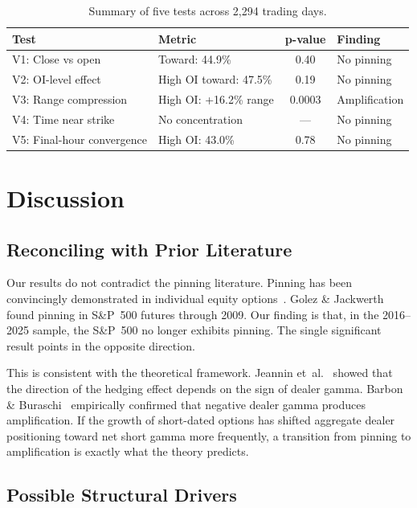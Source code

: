 \documentclass[11pt]{article}
\begin{document}
\begin{table}[h]
\centering
\begin{tabular}{llcl}
\toprule
Test & Metric & p-value & Finding \\
\midrule
V1: Close vs open & Toward: 44.9\% & 0.40 & No pinning \\
V2: OI-level effect & High OI toward: 47.5\% & 0.19 & No pinning \\
V3: Range compression & High OI: +16.2\% range & 0.0003 & Amplification \\
V4: Time near strike & No concentration & --- & No pinning \\
V5: Final-hour convergence & High OI: 43.0\% & 0.78 & No pinning \\
\bottomrule
\end{tabular}
\caption{Summary of five tests across 2{,}294 trading days.}
\label{tab:summary}
\end{table}

\section{Discussion}

\subsection{Reconciling with Prior Literature}

Our results do not contradict the pinning literature. Pinning has been convincingly demonstrated in individual equity options~\cite{ni2005,filippou2022}. Golez \& Jackwerth~\cite{golez2012} found pinning in S\&P~500 futures through 2009. Our finding is that, in the 2016--2025 sample, the S\&P~500 no longer exhibits pinning. The single significant result points in the opposite direction.

This is consistent with the theoretical framework. Jeannin et~al.~\cite{jeannin2008} showed that the direction of the hedging effect depends on the sign of dealer gamma. Barbon \& Buraschi~\cite{barbon2021} empirically confirmed that negative dealer gamma produces amplification. If the growth of short-dated options has shifted aggregate dealer positioning toward net short gamma more frequently, a transition from pinning to amplification is exactly what the theory predicts.

\subsection{Possible Structural Drivers}
\end{document}
